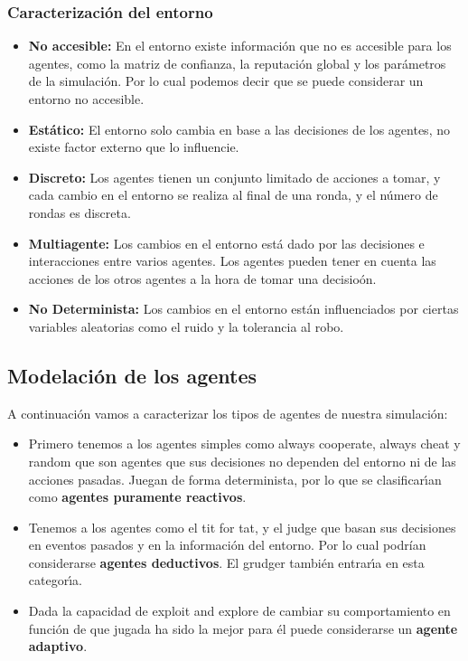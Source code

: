 \documentclass{article}
\begin{document}
\subsubsection{Caracterizaci\'on del entorno}
\begin{itemize}
      \item \textbf{No accesible:} En el entorno existe informaci\'on que no es accesible para los agentes, como la matriz de confianza, la reputaci\'on global y los par\'ametros
            de la simulaci\'on. Por lo cual podemos decir que se puede considerar un entorno no accesible.
      \item \textbf{Est\'atico:} El entorno solo cambia en base a las decisiones de los agentes, no existe factor externo que lo influencie.
      \item \textbf{Discreto:} Los agentes tienen un conjunto limitado de acciones a tomar, y cada cambio en el entorno se realiza al final de una ronda, y el n\'umero de rondas es discreta.
      \item \textbf{Multiagente:} Los cambios en el entorno est\'a dado por las decisiones e interacciones entre varios agentes. Los agentes pueden tener en cuenta las acciones de los
            otros agentes a la hora de tomar una decisio\'on.
      \item \textbf{No Determinista:} Los cambios en el entorno est\'an influenciados por ciertas variables aleatorias como el ruido y la tolerancia al robo.
\end{itemize}


\subsection{Modelaci\'on de los agentes}
A continuaci\'on vamos a caracterizar los tipos de agentes de nuestra simulaci\'on:
\begin{itemize}
      \item Primero tenemos a los agentes simples como always cooperate, always cheat y random que son agentes que sus decisiones no dependen del entorno
            ni de las acciones pasadas. Juegan de forma determinista, por lo que se clasificar\'{\i}an como \textbf{agentes puramente reactivos}.
      \item Tenemos a los agentes como el tit for tat, y el judge que basan sus decisiones en eventos pasados y en la informaci\'on del entorno. Por lo cual podr\'ian
            considerarse \textbf{agentes deductivos}. El grudger tambi\'en entrar\'{\i}a en esta categor\'{\i}a.
      \item Dada la capacidad de exploit and explore de cambiar su comportamiento en funci\'on de que jugada ha sido la mejor para \'el puede considerarse un
            \textbf{agente adaptivo}.
\end{itemize}
\newpage
\end{document}

